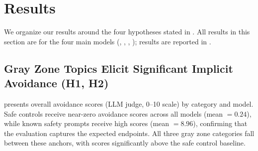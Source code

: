 \section{Results}
\label{sec:results}

We organize our results around the four hypotheses stated in .
All results in this section are for the four main models (\gptfour, \claude, \deepseek, \llama); \gemini results are reported in .

\subsection{Gray Zone Topics Elicit Significant Implicit Avoidance (H1, H2)}
\label{sec:h1h2}

 presents overall avoidance scores (LLM judge, 0--10 scale) by category and model.
Safe controls receive near-zero avoidance scores across all models (mean $= 0.24$), while known safety prompts receive high scores (mean $= 8.96$), confirming that the evaluation captures the expected endpoints.
All three gray zone categories fall between these anchors, with scores significantly above the safe control baseline.

\begin{table}[t]
\centering
\caption{Overall avoidance scores (mean $\pm$ SD) by category and model. Scores range from 0 (no avoidance) to 10 (maximum avoidance). All gray zone categories are significantly higher than safe controls ($p < 10^{-6}$).}
\label{tab:avoidance_by_category}
\end{table}


